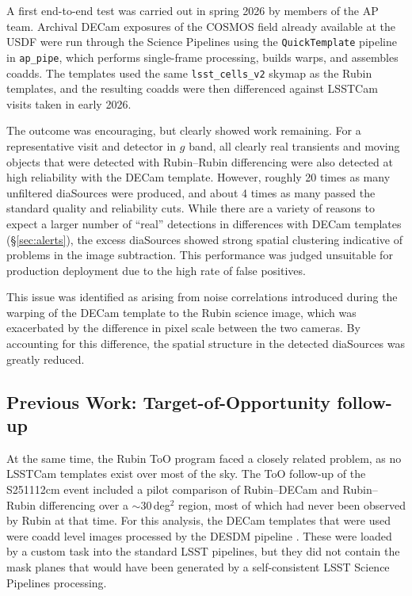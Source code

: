 A first end-to-end test was carried out in spring 2026 by members of the AP team. Archival DECam exposures of the COSMOS field already available at the USDF were run through the Science Pipelines using the \texttt{QuickTemplate} pipeline in \texttt{ap\_pipe}, which performs single-frame processing, builds warps, and assembles coadds. The templates used the same \texttt{lsst\_cells\_v2} skymap as the Rubin templates, and the resulting coadds were then differenced against LSSTCam visits taken in early 2026.
 
The outcome was encouraging, but clearly showed work remaining. For a representative visit and detector in $g$ band, all clearly real transients and moving objects that were detected with Rubin--Rubin differencing were also detected at high reliability with the DECam template. However, roughly 20 times as many unfiltered diaSources were produced, and about 4 times as many passed the standard quality and reliability cuts. 
While there are a variety of reasons to expect a larger number of ``real'' detections in differences with DECam templates (\S \ref{sec:alerts}), the excess diaSources showed strong spatial clustering indicative of problems in the image subtraction.
This performance was judged unsuitable for production deployment due to the high rate of false positives.

This issue was identified as arising from noise correlations introduced during the warping of the DECam template to the Rubin science image, which was exacerbated by the difference in pixel scale between the two cameras.
By accounting for this difference, the spatial structure in the detected diaSources was greatly reduced. 
 
\subsection{Previous Work: Target-of-Opportunity follow-up}
 
At the same time, the Rubin ToO program faced a closely related problem, as no LSSTCam templates exist over most of the sky. The ToO follow-up of the S251112cm event included a pilot comparison of Rubin--DECam and Rubin--Rubin differencing over a $\sim$30\,deg$^2$ region, most of which had never been observed by Rubin at that time. 
For this analysis, the DECam templates that were used were coadd level images processed by the DESDM pipeline \citep{Morganson_2018}.
These were loaded by a custom task into the standard LSST pipelines, but they did not contain the mask planes that would have been generated by a self-consistent LSST Science Pipelines processing.


